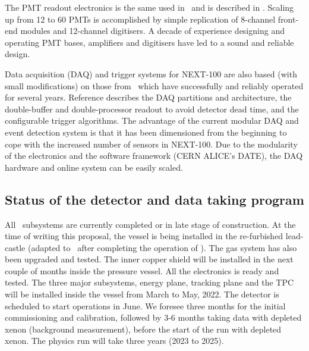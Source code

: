 The PMT readout electronics is the same  used in \NEW\ and is described in \cite{Alvarez:2019a}. Scaling up from 12 to 60 PMTs is accomplished by simple replication of 8-channel front-end modules and 12-channel digitisers. A decade of experience designing and operating PMT bases, amplifiers and digitisers have led to a sound and reliable design. %

Data acquisition (DAQ) and trigger systems for NEXT-100 are also based (with small modifications) on those from \NEW\, which have successfully and reliably operated for several years. Reference \cite{Esteve:2021a} describes the DAQ partitions and architecture, the double-buffer and double-processor readout to avoid detector dead time, and the configurable trigger algorithms. The advantage of the current modular DAQ and event detection system is that it has been dimensioned from the beginning to cope with the increased number of sensors in NEXT-100. Due to the modularity of the electronics and the software framework (CERN ALICE's DATE), the DAQ hardware and online system can be easily scaled.

\subsection{Status of the detector and data taking program}

All \Next\ subsystems are currently completed or in late stage of construction. At the time of writing this proposal, the vessel is being installed in the re-furbished lead-castle (adapted to \Next\ after completing the operation of \NEW). The gas system has also been upgraded and tested. The inner copper shield will be installed in the next couple of months inside the pressure vessel. All the electronics is ready and tested. The three major subsystems, energy plane, tracking plane and the TPC will be installed inside the vessel from March to May, 2022. The detector is scheduled to start operations in June. We foresee three months for the initial commissioning and calibration, followed by 3-6 months taking data with depleted xenon (background measurement), before the start of the run with depleted xenon. 
The physics run will take three years (2023 to 2025). 

